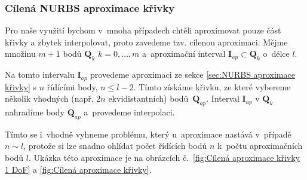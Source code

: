 \subsubsection{Cílená NURBS aproximace křivky}
Pro naše využití bychom v~mnoha případech chtěli aproximovat pouze část křivky
a zbytek interpolovat, proto zavedeme tzv. cílenou aproximaci. Mějme množinu $m
    + 1$ bodů $\bm{Q}_k$ $k = 0, \ldots, m$ a~aproximační interval $\bm{I}_{ap}
    \subset \bm{Q}_k$ o~délce $l$.\par Na tomto intervalu $\bm{I}_{ap}$ provedeme
aproximaci ze sekce \ref{sec:NURBS aproximace křivky} s $n$ řídícími body, $n
    \le l - 2$. Tímto získáme křivku, ze které vybereme několik vhodných (např.
$2n$ ekvidistantních) bodů~$\bm{Q}_{ap}$. Interval $\bm{I}_{ap}$ v $\bm{Q}_k$
nahradíme body $\bm{Q}_{ap}$ a~provedeme interpolaci. \par Tímto se i~vhodně
vyhneme problému, který u~aproximace nastává v~případě $n \sim l$, protože si
lze snadno ohlídat počet řídících bodů $n$ k~počtu aproximačních bodů $l$.
Ukázka této aproximace je na obrázcích č.~\ref{fig:Cílená aproximace křivky 1 DoF} a \ref{fig:Cílená aproximace křivky}.